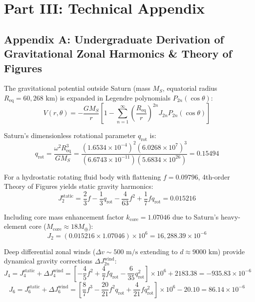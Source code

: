 \documentclass[11pt,a4paper]{article}
\begin{document}
\section*{Part III: Technical Appendix}

\subsection*{Appendix A: Undergraduate Derivation of Gravitational Zonal Harmonics \& Theory of Figures}

The gravitational potential outside Saturn (mass $M_S$, equatorial radius $R_{\text{eq}} = 60,268\text{ km}$) is expanded in Legendre polynomials $P_{2n}(\cos \theta)$:
\begin{equation}
V(r, \theta) = -\frac{G M_S}{r} \left[ 1 - \sum_{n=1}^\infty \left(\frac{R_{\text{eq}}}{r}\right)^{2n} J_{2n} P_{2n}(\cos \theta) \right]
\end{equation}

Saturn's dimensionless rotational parameter $q_{\text{rot}}$ is:
\begin{equation}
q_{\text{rot}} = \frac{\omega^2 R_{\text{eq}}^3}{G M_S} = \frac{(1.6534 \times 10^{-4})^2 (6.0268 \times 10^7)^3}{(6.6743 \times 10^{-11}) (5.6834 \times 10^{26})} = 0.15494
\end{equation}

For a hydrostatic rotating fluid body with flattening $f = 0.09796$, 4th-order Theory of Figures yields static gravity harmonics:
\begin{equation}
J_2^{\text{static}} = \frac{2}{3} f - \frac{1}{3} q_{\text{rot}} - \frac{4}{63} f^2 + \frac{1}{7} f q_{\text{rot}} = 0.015216
\end{equation}

Including core mass enhancement factor $k_{\text{core}} = 1.07046$ due to Saturn's heavy-element core ($M_{\text{core}} \approx 18 M_{\oplus}$):
\begin{equation}
J_2 = (0.015216 \times 1.07046) \times 10^6 = 16,288.39 \times 10^{-6}
\end{equation}

Deep differential zonal winds ($\Delta v \sim 500\text{ m/s}$ extending to $d \approx 9000\text{ km}$) provide dynamical gravity corrections $\Delta J_{2n}^{\text{wind}}$:
\begin{equation}
J_4 = J_4^{\text{static}} + \Delta J_4^{\text{wind}} = \left[ -\frac{4}{5} f^2 + \frac{4}{7} f q_{\text{rot}} - \frac{6}{35} q_{\text{rot}}^2 \right] \times 10^6 + 2183.38 = -935.83 \times 10^{-6}
\end{equation}
\begin{equation}
J_6 = J_6^{\text{static}} + \Delta J_6^{\text{wind}} = \left[ \frac{8}{7} f^3 - \frac{20}{21} f^2 q_{\text{rot}} + \frac{4}{21} f q_{\text{rot}}^2 \right] \times 10^6 - 20.10 = 86.14 \times 10^{-6}
\end{equation}
\end{document}
